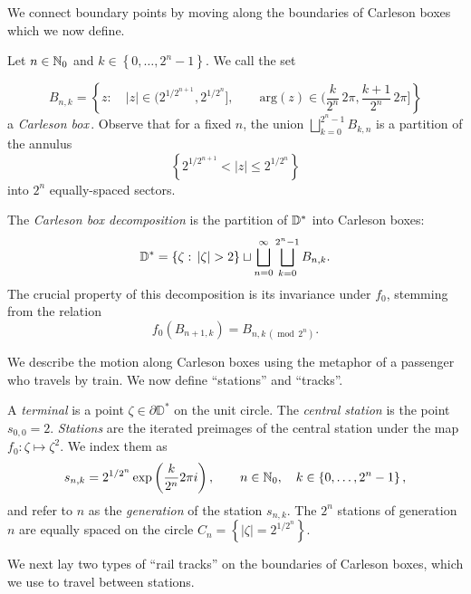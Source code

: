 We connect boundary points by moving along the boundaries of Carleson boxes which we now define.
\begin{definition}
Let $n\in\mathbb{N}_{0}$ and $k\in\left\{ 0,\ldots,2^{n}-1\right\} $. We call the set

\[
B_{n,k}=\left\{ z:\quad\left|z\right|\in\biggl(2^{1/2^{n+1}}, 2^{1/2^{n}} \biggl],\qquad\mathrm{arg}(z)\in\biggl(\frac{k}{2^{n}} \, 2\pi,\frac{k+1}{2^{n}} \, 2\pi\biggl]\right\} 
\]
a \emph{Carleson box}\,.
Observe that for a fixed $n$, the union $\bigsqcup_{k=0}^{2^{n}-1}B_{k,n}$
is a partition of the annulus 
\[
\left\{ 2^{1/2^{n+1}} <\left|z\right|\leq 2^{1/2^{n}} \right\} 
\]
 into $2^{n}$ equally-spaced sectors.
 
The \emph{Carleson box decomposition} is the partition of $\mathbb{D}^{*}$ into Carleson
boxes:
\[
\D^{*}=\left\{ \zeta:\,\left|\zeta\right|>2\right\} \sqcup\bigsqcup_{n=0}^{\infty}\bigsqcup_{k=0}^{2^{n}-1}B_{n,k}.
\]
The crucial property of this decomposition is its invariance under $f_{0}$,
stemming from the relation
\begin{equation*}
f_{0}\left(B_{n+1,k}\right)=B_{n,k \,(\operatorname{mod} \,2^n)}.
\end{equation*}
\end{definition}

We describe the motion along Carleson boxes using the metaphor of a passenger who travels by train. 
We now define \enquote{stations} and \enquote{tracks}.

\begin{definition}
A \emph{terminal} is a point $\zeta \in \partial \mathbb D^*$ on the unit circle.
The \emph{central station} is the point $s_{0,0}=2$. \emph{Stations
}are the iterated preimages of the central station under the map $f_{0}:\zeta\mapsto \zeta^{2}$.
We index them as 
\[
s_{n,k}=2^{1/2^{n}} \exp\left(\frac{k}{2^{n}}2\pi i\right),\qquad n\in\mathbb{N}_{0},\quad k\in\left\{ 0,\ldots,2^{n}-1\right\},
\]
and refer to $n$ as the \emph{generation} of the station $s_{n,k}$. The $2^{n}$ stations of generation $n$ are equally spaced on the circle $C_{n}=\left\{ \left|\zeta\right|=2^{1/2^{n}}\right\} $. 
\end{definition}

We next lay two types of \enquote{rail tracks} on the boundaries of Carleson boxes, which we use to travel between stations.

